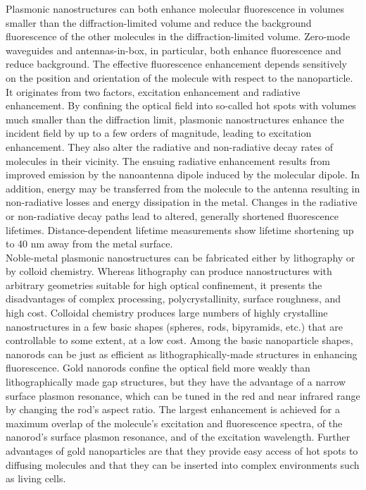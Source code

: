\documentclass[journal=jacsat,manuscript=article]{achemso}
\begin{document}
Plasmonic nanostructures can both enhance molecular fluorescence in volumes smaller than the diffraction-limited volume and reduce the background fluorescence of the other molecules in the diffraction-limited volume. Zero-mode waveguides and antennas-in-box, in particular, both enhance fluorescence and reduce background.\cite{levene2003zeromode,kinkhabwala2012fluorescence,punj2013a,yuan2013thousandfold,punj2013gold} The effective fluorescence enhancement depends sensitively on the position and orientation of the molecule with respect to the nanoparticle. It originates from two factors, excitation enhancement and radiative enhancement. By confining the optical field into so-called hot spots with volumes much smaller than the diffraction limit,\cite{schuller2010plasmonics} plasmonic nanostructures enhance the incident field by up to a few orders of magnitude, leading to excitation enhancement.\cite{yuan2013thousandfold,anger2006enhancement,kinkhabwala2009large,acuna2012fluorescence,busson2012accelerated,holzmeister2014quantum,khatua2014resonant} They also alter the radiative and non-radiative decay rates of molecules in their vicinity. The ensuing radiative enhancement results from improved emission by the nanoantenna dipole induced by the molecular dipole. In addition, energy may be transferred from the molecule to the antenna resulting in non-radiative losses and energy dissipation in the metal. Changes in the radiative or non-radiative decay paths lead to altered, generally shortened fluorescence lifetimes.\cite{khatua2014resonant,liu2007quantized,lakowicz2001radiative,dulkeith2005gold,seelig2007nanoparticleinduced,muskens2007strong,pelton2015modified} Distance-dependent lifetime measurements show lifetime shortening up to 40 nm away from the metal surface.\cite{seelig2007nanoparticleinduced}\\

Noble-metal plasmonic nanostructures can be fabricated either by lithography or by colloid chemistry.\cite{zijlstra2011single} Whereas lithography can produce nanostructures with arbitrary geometries suitable for high optical confinement, it presents the disadvantages of complex processing, polycrystallinity, surface roughness, and high cost. Colloidal chemistry produces large numbers of highly crystalline nanostructures in a few basic shapes (spheres, rods, bipyramids, etc.) that are controllable to some extent, at a low cost. Among the basic nanoparticle shapes, nanorods\cite{yuan2013thousandfold} can be just as efficient as lithographically-made structures\cite{punj2013a,kinkhabwala2009large} in enhancing fluorescence. Gold nanorods confine the optical field more weakly than lithographically made gap structures, but they have the advantage of a narrow surface plasmon resonance, which can be tuned in the red and near infrared range by changing the rod’s aspect ratio.\cite{khatua2014resonant} The largest enhancement is achieved for a maximum overlap of the molecule’s excitation and fluorescence spectra, of the nanorod’s surface plasmon resonance, and of the excitation wavelength. Further advantages of gold nanoparticles are that they provide easy access of hot spots to diffusing molecules and that they can be inserted into complex environments such as living cells.\\
\end{document}
